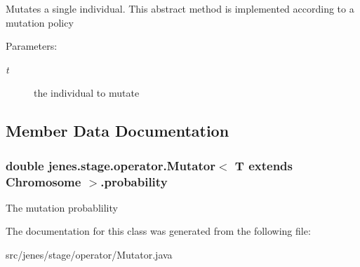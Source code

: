 Mutates a single individual. This abstract method is implemented according to a mutation policy

\begin{Desc}
\item[Parameters:]
\begin{description}
\item[{\em t}]the individual to mutate \end{description}
\end{Desc}


\subsection{Member Data Documentation}
\hypertarget{classjenes_1_1stage_1_1operator_1_1_mutator_3_01_t_01extends_01_chromosome_01_4_60f38eb7afd1ad6a7d1c0c639df2d5fe}{
\subsubsection[probability]{\setlength{\rightskip}{0pt plus 5cm}double jenes.stage.operator.Mutator$<$ T extends Chromosome $>$.{\bf probability}}}
\label{classjenes_1_1stage_1_1operator_1_1_mutator_3_01_t_01extends_01_chromosome_01_4_60f38eb7afd1ad6a7d1c0c639df2d5fe}


The mutation probablility 

The documentation for this class was generated from the following file:\begin{CompactItemize}
\item 
src/jenes/stage/operator/Mutator.java\end{CompactItemize}
